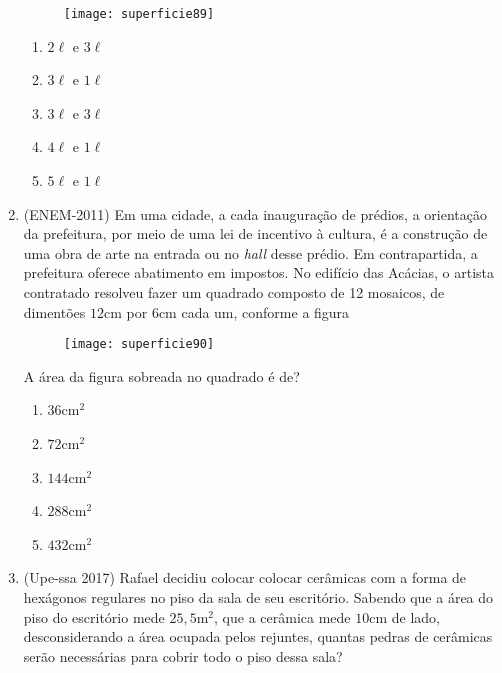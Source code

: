\begin{enumerate}
  \begin{multicols}{2}
  \begin{figure}[H]
    \centering
  
    \texttt{[image: superficie89]}
    \end{figure}
  
    \begin{enumerate}
      \item $2\ell$ e $3\ell$
      \item $3\ell$ e $1\ell$
      \item $3\ell$ e $3\ell$
      \item $4\ell$ e $1\ell$
      \item $5\ell$ e $1\ell$
    \end{enumerate}
  \end{multicols}

  \item (ENEM-2011) Em uma cidade, a cada inauguração de prédios, a orientação da prefeitura, por meio de uma lei de incentivo à cultura, é a construção de uma obra de arte na entrada ou no \textit{hall} desse prédio. Em contrapartida, a prefeitura oferece abatimento em impostos. No edifício das Acácias, o artista contratado resolveu fazer um quadrado composto de 12 mosaicos, de dimentões $12\text{cm}$ por $6$cm cada um, conforme a figura

  \begin{figure}[H]
  \centering

  \texttt{[image: superficie90]}
  \end{figure}

  A área da figura sobreada no quadrado é de?
  \begin{enumerate}
    \item $36$cm$^2$
    \item $72$cm$^2$
    \item $144$cm$^2$
    \item $288$cm$^2$
    \item $432$cm$^2$
  \end{enumerate}

  \item (Upe-ssa 2017) Rafael decidiu colocar colocar cerâmicas com a forma de hexágonos regulares no piso da sala de seu escritório. Sabendo que a área do piso do escritório mede $25{,}5$m$^2$, que a cerâmica mede $10$cm de lado, desconsiderando a área ocupada pelos rejuntes, quantas pedras de cerâmicas serão necessárias para cobrir todo o piso dessa sala?
  \begin{figure}[H]
  \centering


\end{figure}
\end{enumerate}
